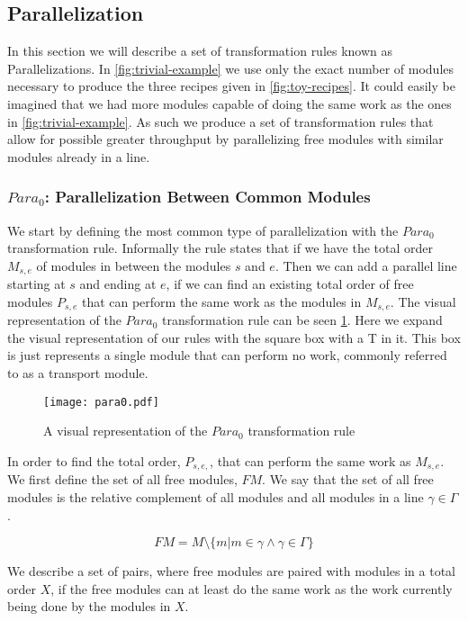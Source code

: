 \subsection{Parallelization}
In this section we will describe a set of transformation rules known as Parallelizations. In \cref{fig:trivial-example} we use only the exact number of modules necessary to produce the three recipes given in \cref{fig:toy-recipes}. It could easily be imagined that we had more modules capable of doing the same work as the ones in \cref{fig:trivial-example}. As such we produce a set of transformation rules that allow for possible greater throughput by parallelizing free modules with similar modules already in a line.


\subsubsection{$Para_0$: Parallelization Between Common Modules}
We start by defining the most common type of parallelization with the $Para_0$ transformation rule. Informally the rule states that if we have the total order $M_{s,e}$ of modules in between the modules $s$ and $e$. Then we can add a parallel line starting at $s$ and ending at $e$, if we can find an existing total order of free modules $P_{s,e}$ that can perform the same work as the modules in $M_{s,e}$. The visual representation of the $Para_0$ transformation rule can be seen \cref{fig:para0}. Here we expand the visual representation of our rules with the square box with a T in it. This box is just represents a single module that can perform no work, commonly referred to as a transport module.

\begin{figure}[H]
	\centering
	\texttt{[image: para0.pdf]}
	\caption{A visual representation of the $Para_0$ transformation rule}
	\label{fig:para0}
\end{figure}

In order to find the total order, $P_{s,e,}$, that can perform the same work as $M_{s,e}$. We first define the set of all free modules, $FM$. We say that the set of all free modules is the relative complement of all modules and all modules in a line $\gamma \in \Gamma$.

\[FM = M \setminus \{m | m \in \gamma \land \gamma \in \Gamma\}\]

We describe a set of pairs, where free modules are paired with modules in a total order $X$, if the free modules can at least do the same work as the work currently being done by the modules in $X$.

